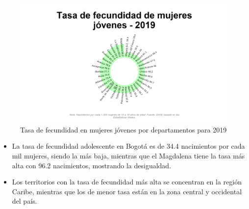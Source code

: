     \begin{figure}[H]
        \caption{Tasa de fecundidad en mujeres jóvenes por departamentos para 2019 \label{map_result_2} }
        \begin{center}
        \includegraphics[width=\textwidth,keepaspectratio]{img/var_282_static.png}
        \end{center}
    \end{figure}
            \begin{itemize}
                \item La tasa de fecundidad adolescente en Bogotá es de 34.4 nacimientos por cada mil mujeres, siendo la más baja, mientras que el Magdalena tiene la tasa más alta con 96.2 nacimientos, mostrando la desigualdad.
                \item Los territorios con la tasa de fecundidad más alta se concentran en la región Caribe, mientras que los de menor tasa están en la zona central y occidental del país.
                \end{itemize}

